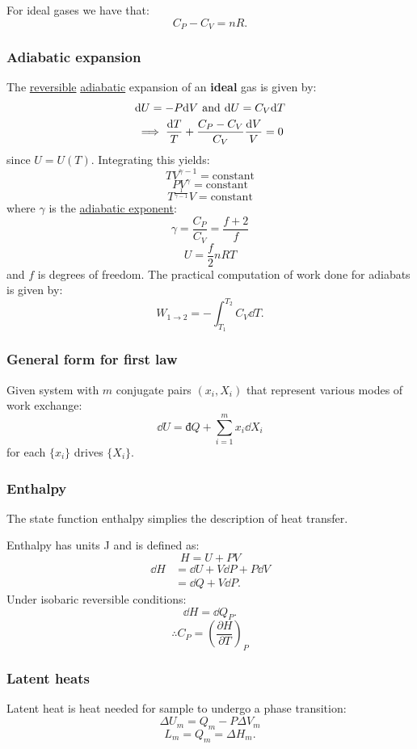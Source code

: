 \documentclass{article}
\newcommand{\idd}{\text{đ}}
\begin{document}
\begin{multicols*}{3}
For ideal gases we have that:
$$C_P-C_V=nR.$$

\subsubsection*{Adiabatic expansion}
The \underline{reversible} \underline{adiabatic}
expansion of an \textbf{ideal} gas is given by:
\begin{align*}
    &\dd U=-P\dd V
    \hspace{0.05in}\text{and}\hspace{0.05in}
    \dd U=C_V\dd T \\
    &\implies
    \frac{\dd T}{T}
    +\frac{C_P-C_V}{C_V}\frac{\dd V}{V}=0
\end{align*}
since $U=U(T)$.
Integrating this yields:
$$TV^{\gamma-1}=\text{constant}$$
$$PV^{\gamma}=\text{constant}$$
$$T^{\frac{1}{\gamma-1}}V=\text{constant}$$
where $\gamma$ is the \underline{adiabatic exponent}:
$$\gamma=\frac{C_P}{C_V}
=\frac{f+2}{f}$$
$$U=\frac{f}{2}nRT$$
and $f$ is degrees of freedom.
The practical computation of work done
for adiabats is given by:
$$W_{1\rightarrow2}
=-\int_{T_1}^{T_2}C_V\dd T.$$

\subsubsection*{General form for first law}
Given system with $m$ conjugate pairs
$(x_i,X_i)$ that represent various modes
of work exchange:
$$\dd U=\idd Q+
\sum_{i=1}^{m}x_i\dd X_i$$
for each $\{x_i\}$ 
drives $\{X_i\}$.

\columnbreak

\subsubsection*{Enthalpy}
The state function enthalpy simplies the
description of heat transfer. 

Enthalpy has units J
and is defined as:
$$H=U+PV$$
\begin{align*}
    \dd H
    &=\dd U+V\dd P+P\dd V \\
    &=\dd Q+V\dd P.
\end{align*}
Under isobaric reversible conditions:
$$\dd H=\dd Q_P.$$
$$\therefore C_P
=\left(\frac{\partial H}{\partial T}\right)_P$$

\subsubsection*{Latent heats}
Latent heat is heat needed for sample
to undergo a phase transition:
$$\Delta U_m=Q_m-P\Delta V_m$$
$$L_m=Q_m=\Delta H_m.$$


\end{multicols*}
\end{document}
